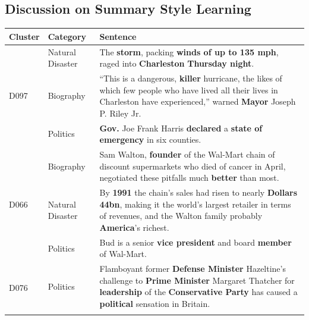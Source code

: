 \documentclass[letterpaper]{article}
\begin{document}
\subsection{Discussion on Summary Style Learning}
\begin{table}[t]
\centering
\small
\begin{tabular}{l|l|p{11cm}}
\hline
Cluster               & Category         & Sentence                                                                                                                                                                   \\ \hline
\multirow{3}{*}{D097} & Natural Disaster & The \textbf{storm}, packing \textbf{winds of up to 135 mph}, raged into \textbf{Charleston} \textbf{Thursday night}.                                                                                           \\ \cline{2-3}
& Biography        & ``This is a dangerous, \textbf{killer} hurricane, the likes of which few people who have lived all their lives in Charleston have experienced,'' warned \textbf{Mayor} Joseph P. Riley Jr.   \\ \cline{2-3}
& Politics         & \textbf{Gov.} Joe Frank Harris \textbf{declared} a \textbf{state of emergency} in six counties.                                                                                                       \\ \hline
\multirow{3}{*}{D066} & Biography        & Sam Walton, \textbf{founder} of the Wal-Mart chain of discount supermarkets who died of cancer in April, negotiated these pitfalls much \textbf{better} than most.                           \\ \cline{2-3}
& Natural Disaster & By \textbf{1991} the chain's sales had risen to nearly \textbf{Dollars 44bn}, making it the world's largest retailer in terms of revenues, and the Walton family probably \textbf{America}'s richest. \\ \cline{2-3}
& Politics         & Bud is a senior \textbf{vice president} and board \textbf{member} of Wal-Mart.                                                                                                               \\ \hline
\multirow{3}{*}{D076} & Politics         & Flamboyant former \textbf{Defense Minister} Hazeltine's challenge to \textbf{Prime Minister} Margaret Thatcher for \textbf{leadership} of the \textbf{Conservative Party} has caused a \textbf{political} sensation in Britain.   \\ \cline{2-3}

\end{tabular}
\end{table}
\end{document}
